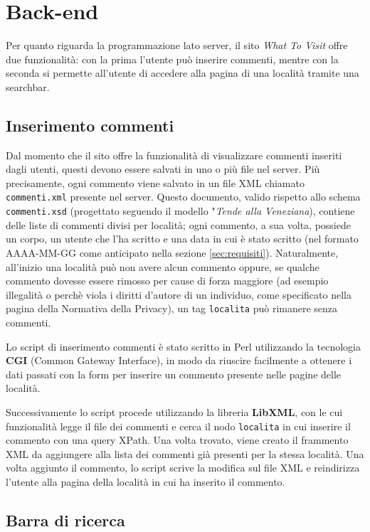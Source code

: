 \section{Back-end}
Per quanto riguarda la programmazione lato server, il sito \textit{What To
Visit} offre due funzionalità: con la prima l'utente può inserire commenti,
mentre con la seconda si permette all'utente di accedere alla pagina di una
località tramite una searchbar.

\subsection{Inserimento commenti}
Dal momento che il sito offre la funzionalità di visualizzare commenti inseriti
dagli utenti, questi devono essere salvati in uno o più file nel server. Più
precisamente, ogni commento viene salvato in un file XML chiamato
\texttt{commenti.xml} presente nel server.
Questo documento, valido rispetto allo schema \texttt{commenti.xsd}
(progettato seguendo il modello "\textit{Tende alla Veneziana}), contiene
delle liste di commenti divisi per località; ogni commento, a sua volta,
possiede un corpo, un utente che l'ha scritto e una data in cui è stato
scritto (nel formato AAAA-MM-GG come anticipato nella sezione
\ref{sec:requisiti}). Naturalmente, all'inizio una località può non avere
alcun commento oppure, se qualche commento dovesse essere rimosso per cause di
forza maggiore (ad esempio illegalità o perchè viola i diritti d'autore di un
individuo, come specificato nella pagina della Normativa della Privacy), un
tag \texttt{localita} può rimanere senza commenti.

Lo script di inserimento commenti è stato scritto in Perl utilizzando la
tecnologia \textbf{CGI} (Common Gateway Interface), in modo da riuscire
facilmente a ottenere i dati passati con la form per inserire un commento
presente nelle pagine delle località.

Successivamente lo script procede utilizzando la libreria \textbf{LibXML}, con
le cui funzionalità legge il file dei commenti e cerca il nodo
\texttt{localita} in cui inserire il commento con una query XPath.
Una volta trovato, viene creato il frammento XML da aggiungere alla lista dei
commenti già presenti per la stessa località. Una volta aggiunto il commento,
lo script scrive la modifica sul file XML e reindirizza l'utente alla pagina
della località in cui ha inserito il commento.

\subsection{Barra di ricerca}
